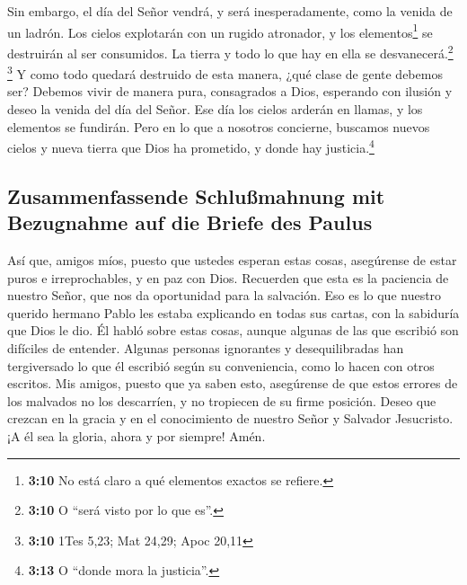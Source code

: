  Sin embargo, el día del Señor vendrá, y será
inesperadamente, como la venida de un ladrón. Los cielos explotarán con
un rugido atronador, y los elementos\footnote{\textbf{3:10} No está
  claro a qué elementos exactos se refiere.} se destruirán al ser
consumidos. La tierra y todo lo que hay en ella se
desvanecerá.\footnote{\textbf{3:10} O ``será visto por lo que es''.}
\footnote{\textbf{3:10} 1Tes 5,23; Mat 24,29; Apoc 20,11}
 Y como todo quedará destruido de esta manera, ¿qué clase
de gente debemos ser? Debemos vivir de manera pura, consagrados a Dios,
 esperando con ilusión y deseo la venida del día del
Señor. Ese día los cielos arderán en llamas, y los elementos se
fundirán.  Pero en lo que a nosotros concierne, buscamos
nuevos cielos y nueva tierra que Dios ha prometido, y donde hay
justicia.\footnote{\textbf{3:13} O ``donde mora la justicia''.}

\hypertarget{zusammenfassende-schluuxdfmahnung-mit-bezugnahme-auf-die-briefe-des-paulus}{%
\subsection{Zusammenfassende Schlußmahnung mit Bezugnahme auf die Briefe
des
Paulus}\label{zusammenfassende-schluuxdfmahnung-mit-bezugnahme-auf-die-briefe-des-paulus}}

 Así que, amigos míos, puesto que ustedes esperan estas
cosas, asegúrense de estar puros e irreprochables, y en paz con Dios.
 Recuerden que esta es la paciencia de nuestro Señor, que
nos da oportunidad para la salvación. Eso es lo que nuestro querido
hermano Pablo les estaba explicando en todas sus cartas, con la
sabiduría que Dios le dio.  Él habló sobre estas cosas,
aunque algunas de las que escribió son difíciles de entender. Algunas
personas ignorantes y desequilibradas han tergiversado lo que él
escribió según su conveniencia, como lo hacen con otros escritos.
 Mis amigos, puesto que ya saben esto, asegúrense de que
estos errores de los malvados no los descarríen, y no tropiecen de su
firme posición.  Deseo que crezcan en la gracia y en el
conocimiento de nuestro Señor y Salvador Jesucristo. ¡A él sea la
gloria, ahora y por siempre! Amén.

